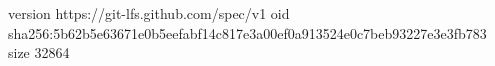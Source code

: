 version https://git-lfs.github.com/spec/v1
oid sha256:5b62b5e63671e0b5eefabf14c817e3a00ef0a913524e0c7beb93227e3e3fb783
size 32864
